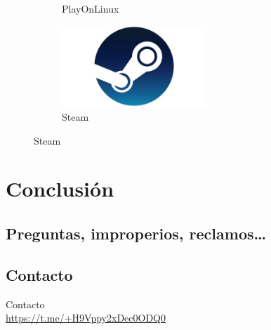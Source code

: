 \documentclass[aspectratio=43]{beamer}
\begin{document}
\begin{frame}{\secname}{\subsecname}
\begin{figure}
\begin{subfigure}{.4\textwidth}
                \caption*{PlayOnLinux}
            \end{subfigure}
            \pause
            \begin{subfigure}{.4\textwidth}
                \centering
                \includegraphics[width=0.6\textwidth]{img/steam.png}
                \caption*{Steam}
            \end{subfigure}
        \end{figure}
    \end{frame}

    \section{Conclusión}
    \subsection{Preguntas, improperios, reclamos\ldots}
    \begin{frame}[plain]{\subsecname}
    \end{frame}
    \subsection{Contacto}
    \begin{frame}{Contacto}
        \centering{}
        \hphantom{}\\
        \url{https://t.me/+H9Vppy2xDec0ODQ0}
    \end{frame}
\end{document}
